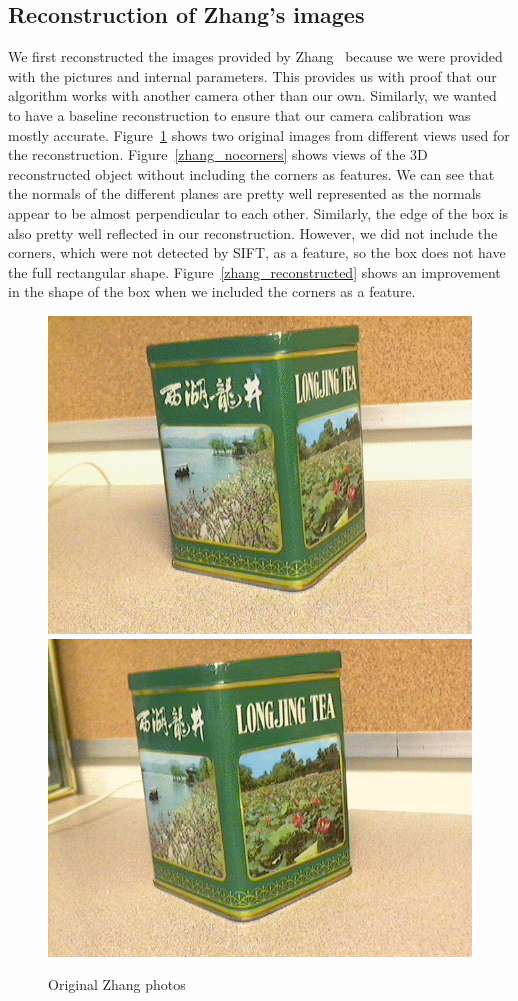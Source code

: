 \subsection{Reconstruction of Zhang's images}
We first reconstructed the images provided by Zhang~\cite{Calibration} because we were provided with the pictures and internal parameters. This provides us with proof that our algorithm works with another camera other than our own. Similarly, we wanted to have a baseline reconstruction to ensure that our camera calibration was mostly accurate. Figure~\ref{zhang_original} shows two original images from different views used for the reconstruction. Figure~\ref{zhang_nocorners} shows views of the 3D reconstructed object without including the corners as features. We can see that the normals of the different planes are pretty well represented as the normals appear to be almost perpendicular to each other. Similarly, the edge of the box is also pretty well reflected in our reconstruction. However, we did not include the corners, which were not detected by SIFT, as a feature, so the box does not have the full rectangular shape. Figure~\ref{zhang_reconstructed} shows an improvement in the shape of the box when we included the corners as a feature.

\begin{figure}[H]
\begin{center}
\includegraphics[width=0.45\linewidth]{figures/TeaBox1.jpg}
\includegraphics[width=0.45\linewidth]{figures/TeaBox2.jpg}
\end{center}
\caption{Original Zhang photos}
\label{zhang_original}
\end{figure}

